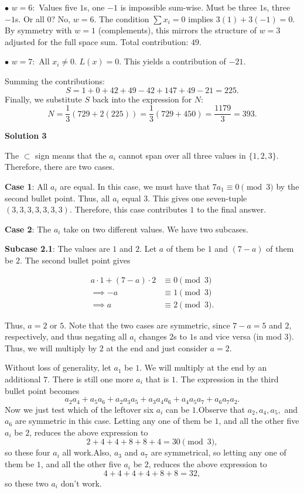 \begin{enumerate}
 $\bullet$ $w = 6:$ Values five $1$s, one $-1$ is impossible sum-wise. Must be three $1$s, three $-1$s. Or all $0$? No, $w=6$. The condition $\sum x_i = 0$ implies $3(1) + 3(-1) = 0$. By symmetry with $w=1$ (complements), this mirrors the structure of $w=3$ adjusted for the full space sum. Total contribution: $49$.

 $\bullet$ $w = 7:$ All $x_i \neq 0$. $L(x)=0$. This yields a contribution of $-21$. 

 Summing the contributions:
 \[S = 1 + 0 + 42 + 49 - 42 + 147 + 49 - 21 = 225.\]Finally, we substitute $S$ back into the expression for $N$:
 \[N = \frac{1}{3} (729 + 2(225)) = \frac{1}{3} (729 + 450) = \frac{1179}{3} = 393.\]




\textbf{Solution 3}

The $\subset$ sign means that the $a_i$ cannot span over all three values in $\{1,2,3\}$. Therefore, there are two cases.

 
\textbf{Case 1}: All $a_i$ are equal. In this case, we must have that $7a_1 \equiv 0 \pmod 3$ by the second bullet point. Thus, all $a_i$ equal $3$. This gives one seven-tuple $(3,3,3,3,3,3,3)$. Therefore, this case contributes $1$ to the final answer.

 
\textbf{Case 2}: The $a_i$ take on two different values. We have two subcases.

 
\textbf{Subcase 2.1}: The values are $1$ and $2$. Let $a$ of them be $1$ and $(7-a)$ of them be $2$. The second bullet point gives

 \begin{align*}a \cdot 1 + (7-a) \cdot 2 &\equiv 0 \pmod 3 \\\implies -a &\equiv 1 \pmod 3 \\\implies a &\equiv 2 \pmod 3.\end{align*}


 Thus, $a = 2$ or $5$. Note that the two cases are symmetric, since $7-a = 5$ and $2$, respectively, and thus negating all $a_i$ changes $2$s to $1$s and vice versa (in mod $3$). Thus, we will multiply by $2$ at the end and just consider $a = 2$.

 Without loss of generality, let $a_1$ be $1$. We will multiply at the end by an additional $7$. There is still one more $a_i$ that is $1$. The expression in the third bullet point becomes
 \[a_2a_4 + a_5a_6 + a_2a_3a_5 + a_3a_4a_6 + a_4a_5a_7 + a_6a_7a_2.\]Now we just test which of the leftover six $a_i$ can be $1$.Observe that $a_2,a_4,a_5,$ and $a_6$ are symmetric in this case. Letting any one of them be $1$, and all the other five $a_i$ be $2$, reduces the above expression to
 \[2+4+4+8+8+4 = 30 \pmod 3,\]so these four $a_i$ all work.Also, $a_3$ and $a_7$ are symmetrical, so letting any one of them be $1$, and all the other five $a_i$ be $2$, reduces the above expression to
 \[4+4+4+4+8+8 = 32,\]so these two $a_i$ don't work.


\end{enumerate}
